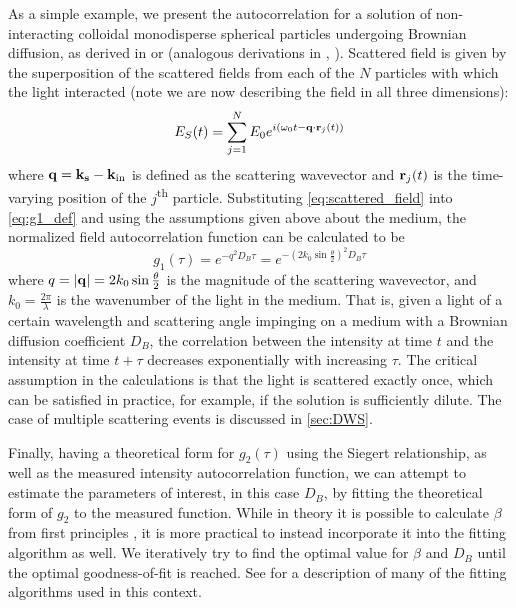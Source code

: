 As a simple example, we present the autocorrelation for a solution of non-interacting colloidal monodisperse spherical particles undergoing Brownian diffusion, as derived in \cite[ch. 16.2.2]{Brown1993} or \cite{Boas1997} (analogous derivations in \cite{BernePecora1976}, \cite{Schmitz1990}). Scattered field is given by the superposition of the scattered fields from each of the $N$ particles with which the light interacted (note we are now describing the field in all three dimensions):
\begin{equation} \label{eq:scattered_field}
E_S(t) = \sum_{j=1}^{N} E_0 e^{i\left(\omega_0 t - \vb{q}\cdot\vb{r}_j(t)\right)}
\end{equation}
where $\vb{q}=\vb{k_s}-\vb{k_\textnormal{in}}$ is defined as the scattering wavevector and $\vb{r}_j(t)$ is the time-varying position of the $j$\textsuperscript{th} particle. Substituting \autoref{eq:scattered_field} into \autoref{eq:g1_def} and using the assumptions given above about the medium, the normalized field autocorrelation function can be calculated to be 
\begin{equation} \label{eq:g1_dls}
g_1(\tau) = e^{-q^2 D_B \tau} = e^{-(2k_0\sin\frac{\theta}{2})^2 D_B \tau} 
\end{equation}
where $q=\abs{\vb{q}}=2k_0\sin\frac{\theta}{2}$ is the magnitude of the scattering wavevector, and $k_0 = \frac{2\pi}{\lambda}$ is the wavenumber of the light in the medium. That is, given a light of a certain wavelength and scattering angle impinging on a medium with a Brownian diffusion coefficient $D_B$, the correlation between the intensity at time $t$ and the intensity at time $t+\tau$ decreases exponentially with increasing $\tau$. The critical assumption in the calculations is that the light is scattered exactly once, which can be satisfied in practice, for example, if the solution is sufficiently dilute. The case of multiple scattering events is discussed in \autoref{sec:DWS}. 

Finally, having a theoretical form for $g_2(\tau)$ using the Siegert relationship, as well as the measured intensity autocorrelation function, we can attempt to estimate the parameters of interest, in this case $D_B$, by fitting the theoretical form of $g_2$ to the measured function. While in theory it is possible to calculate $\beta$ from first principles \cite[ch. 2.3.3.2]{Brown1993}, it is more practical to instead incorporate it into the fitting algorithm as well. We iteratively try to find the optimal value for $\beta$ and $D_B$ until the optimal goodness-of-fit is reached. See \cite[ch. 4.1,4.4]{Brown1993} for a description of many of the fitting algorithms used in this context. 


